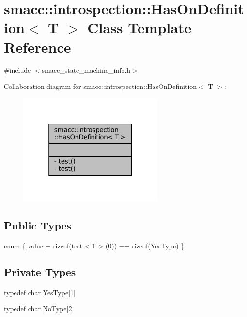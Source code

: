 \hypertarget{classsmacc_1_1introspection_1_1HasOnDefinition}{}\section{smacc\+:\+:introspection\+:\+:Has\+On\+Definition$<$ T $>$ Class Template Reference}
\label{classsmacc_1_1introspection_1_1HasOnDefinition}


{\ttfamily \#include $<$smacc\+\_\+state\+\_\+machine\+\_\+info.\+h$>$}



Collaboration diagram for smacc\+:\+:introspection\+:\+:Has\+On\+Definition$<$ T $>$\+:
\nopagebreak
\begin{figure}[H]
\begin{center}
\leavevmode
\includegraphics[width=208pt]{classsmacc_1_1introspection_1_1HasOnDefinition__coll__graph}
\end{center}
\end{figure}
\subsection*{Public Types}
\begin{DoxyCompactItemize}
\item 
enum \{ \hyperlink{classsmacc_1_1introspection_1_1HasOnDefinition_ab40a368fd2564562bf0107984f5f197da2c667ca4893ef31062bc9864e4d06ab2}{value} = sizeof(test$<$T$>$(0)) == sizeof(Yes\+Type)
 \}
\end{DoxyCompactItemize}
\subsection*{Private Types}
\begin{DoxyCompactItemize}
\item 
typedef char \hyperlink{classsmacc_1_1introspection_1_1HasOnDefinition_ad18cda8f47c5a0e9660b7c7ca54d98c7}{Yes\+Type}\mbox{[}1\mbox{]}
\item 
typedef char \hyperlink{classsmacc_1_1introspection_1_1HasOnDefinition_ab6416d52a925d6a0ce9204897191692e}{No\+Type}\mbox{[}2\mbox{]}
\end{DoxyCompactItemize}
